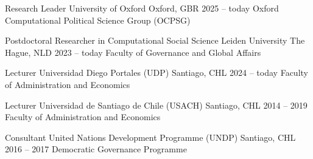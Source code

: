 






\begin{cventries}
\cventry
{Research Leader} 
{University of Oxford} 
{Oxford, GBR} 
{2025 -- today}
{Oxford Computational Political Science Group (OCPSG)} \vspace{1.5mm}

\cventry
{Postdoctoral Researcher in Computational Social Science} 
{Leiden University} 
{The Hague, NLD} 
{2023 -- today}
{Faculty of Governance and Global Affairs} \vspace{1.5mm}

\cventry
{Lecturer} 
{Universidad Diego Portales (UDP)} 
{Santiago, CHL} 
{2024 -- today}
{Faculty of Administration and Economics} \vspace{1.5mm}

\cventry
{Lecturer} 
{Universidad de Santiago de Chile (USACH)} 
{Santiago, CHL} 
{2014 -- 2019}
{Faculty of Administration and Economics} \vspace{1.5mm}


\cventry
{Consultant} 
{United Nations Development Programme (UNDP)} 
{Santiago, CHL} 
{2016 -- 2017}
{Democratic Governance Programme} %

\end{cventries}

